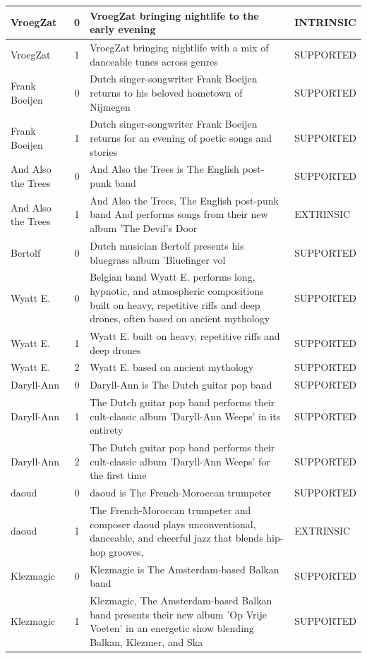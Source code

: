 \begin{center}
\begin{longtable}{p{3cm}cp{7cm}p{3cm}}
VroegZat & 0 & VroegZat bringing nightlife to the early evening & INTRINSIC \\
\midrule
VroegZat & 1 & VroegZat bringing nightlife with a mix of danceable tunes across genres & SUPPORTED \\
\midrule
Frank Boeijen & 0 & Dutch singer-songwriter Frank Boeijen returns to his beloved hometown of Nijmegen & SUPPORTED \\
\midrule
Frank Boeijen & 1 & Dutch singer-songwriter Frank Boeijen returns for an evening of poetic songs and stories & SUPPORTED \\
\midrule
And Also the Trees & 0 & And Also the Trees is The English post-punk band & SUPPORTED \\
\midrule
And Also the Trees & 1 & And Also the Trees, The English post-punk band And performs songs from their new album 'The Devil's Door & EXTRINSIC \\
\midrule
Bertolf & 0 & Dutch musician Bertolf presents his bluegrass album 'Bluefinger vol & SUPPORTED \\
\midrule
Wyatt E. & 0 & Belgian band Wyatt E. performs long, hypnotic, and atmospheric compositions built on heavy, repetitive riffs and deep drones, often based on ancient mythology & SUPPORTED \\
\midrule
Wyatt E. & 1 & Wyatt E. built on heavy, repetitive riffs and deep drones & SUPPORTED \\
\midrule
Wyatt E. & 2 & Wyatt E. based on ancient mythology & SUPPORTED \\
\midrule
Daryll-Ann & 0 & Daryll-Ann is The Dutch guitar pop band & SUPPORTED \\
\midrule
Daryll-Ann & 1 & The Dutch guitar pop band performs their cult-classic album 'Daryll-Ann Weeps' in its entirety & SUPPORTED \\
\midrule
Daryll-Ann & 2 & The Dutch guitar pop band performs their cult-classic album 'Daryll-Ann Weeps' for the first time & SUPPORTED \\
\midrule
daoud & 0 & daoud is The French-Moroccan trumpeter & SUPPORTED \\
\midrule
daoud & 1 & The French-Moroccan trumpeter and composer daoud plays unconventional, danceable, and cheerful jazz that blends hip-hop grooves, & EXTRINSIC \\
\midrule
Klezmagic & 0 & Klezmagic is The Amsterdam-based Balkan band & SUPPORTED \\
\midrule
Klezmagic & 1 & Klezmagic, The Amsterdam-based Balkan band presents their new album 'Op Vrije Voeten' in an energetic show blending Balkan, Klezmer, and Ska & SUPPORTED \\

\end{longtable}
\end{center}
